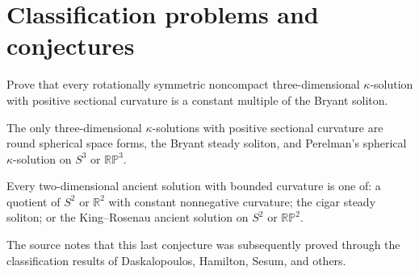 \section{Classification problems and conjectures}

\begin{example}
\label{prob:chow-iii-rotational-kappa-bryant}
Prove that every rotationally symmetric noncompact three-dimensional
$\kappa$-solution with positive sectional curvature is a constant multiple
of the Bryant soliton.
\end{example}

\begin{claim}
\label{conj:chow-iii-3d-positive-kappa-classification}
The only three-dimensional $\kappa$-solutions with positive sectional
curvature are round spherical space forms, the Bryant steady soliton, and
Perelman's spherical $\kappa$-solution on $S^3$ or $\mathbb{RP}^3$.
\end{claim}

\begin{claim}
\label{conj:chow-iii-2d-ancient-classification}
Every two-dimensional ancient solution with bounded curvature is one of:
a quotient of $S^2$ or $\mathbb R^2$ with constant nonnegative curvature;
the cigar steady soliton; or the King--Rosenau ancient solution on $S^2$ or
$\mathbb{RP}^2$.
\end{claim}

The source notes that this last conjecture was subsequently proved through
the classification results of Daskalopoulos, Hamilton, Sesum, and others.
